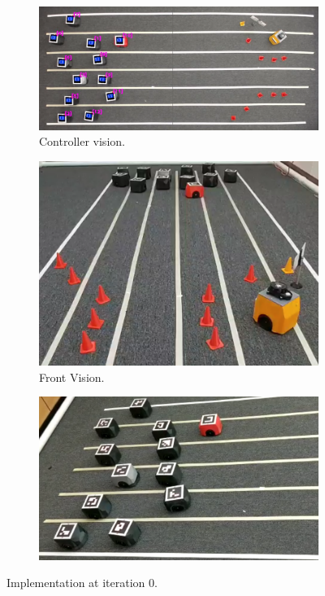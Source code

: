 \begin{appendix}
\begin{figure}[H]
\centering
\begin{subfigure}[t]{\textwidth}
    \includegraphics[width=\textwidth]{Anexos/red_lane/red_lane_it0_cam0.png}
    \caption{Controller vision.}
    \label{fig:first}
\end{subfigure}
\vspace{1cm}
\begin{subfigure}[b]{0.4\textwidth}
    \includegraphics[width=\textwidth]{Anexos/red_lane/red_lane_it0_cam1.png}
    \caption{Front Vision.}
    \label{fig:second}
\end{subfigure}
\hfill
\begin{subfigure}[b]{0.50\textwidth}
    \includegraphics[width=\textwidth]{Anexos/red_lane/red_lane_it0_cam2.png}
    \label{fig:third}
\end{subfigure}
\caption{Implementation at iteration 0.}
\label{fig:figures}
\end{figure}





\end{appendix}
